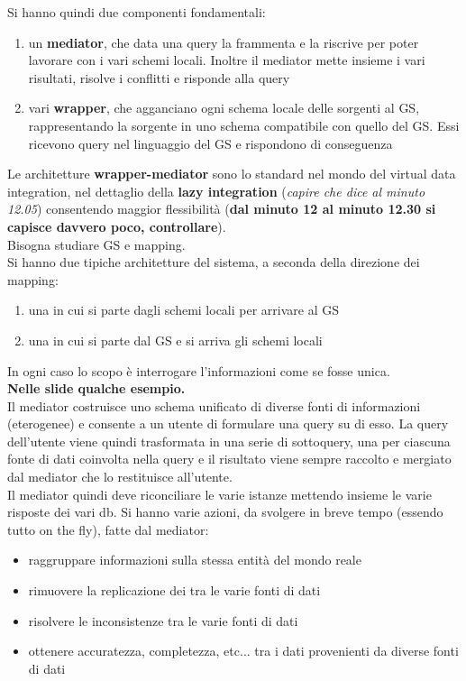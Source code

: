\documentclass[a4paper,12pt, oneside]{book}
\begin{document}
Si hanno quindi due componenti fondamentali:
\begin{enumerate}
  \item un \textbf{mediator}, che data una query la frammenta e la riscrive per
  poter lavorare con i vari schemi locali. Inoltre il mediator mette insieme i
  vari risultati, risolve i conflitti e risponde alla query
  \item vari \textbf{wrapper}, che agganciano ogni schema locale delle sorgenti
  al GS, rappresentando la sorgente in uno schema compatibile con quello del
  GS. Essi ricevono query nel linguaggio del GS e rispondono di conseguenza
\end{enumerate}
Le architetture \textbf{wrapper-mediator} sono lo standard nel mondo del virtual
data integration, nel dettaglio della \textbf{lazy integration} (\textit{capire
  che 
  dice al minuto 12.05}) consentendo maggior flessibilità (\textbf{dal minuto 12
  al minuto 12.30 si capisce davvero poco, controllare}).\\
Bisogna studiare GS e mapping.\\
Si hanno due tipiche architetture del sistema, a seconda della direzione dei
mapping: 
\begin{enumerate}
  \item una in cui si parte dagli schemi locali per arrivare al GS
  \item una in cui si parte dal GS e si arriva gli schemi locali
\end{enumerate}
In ogni caso lo scopo è interrogare l'informazioni come se fosse unica.\\
\textbf{Nelle slide qualche esempio.}\\
Il mediator costruisce uno schema unificato di diverse fonti di informazioni
(eterogenee) e consente a un utente di formulare una query su di esso. La query
dell'utente viene quindi trasformata in una serie di sottoquery, una per
ciascuna fonte di dati coinvolta nella query e il risultato viene sempre
raccolto e mergiato dal mediator che lo restituisce all'utente.\\
Il mediator quindi deve riconciliare le varie istanze mettendo insieme le varie
risposte dei vari db. Si hanno varie azioni, da svolgere in breve tempo (essendo
tutto on the fly), fatte dal mediator:
\begin{itemize}
  \item raggruppare informazioni sulla stessa entità del mondo reale 
  \item rimuovere la replicazione dei tra le varie fonti di dati 
  \item risolvere le inconsistenze tra le varie fonti di dati 
  \item ottenere accuratezza, completezza, etc$\ldots$ tra i dati provenienti da
  diverse fonti di dati   
\end{itemize}
\end{document}

